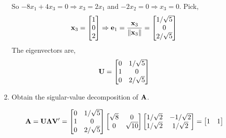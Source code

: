 \begin{enumerate}[font=\bfseries]
\begin{enumerate}
\[            \]
            So $-8x_1 + 4x_3 = 0 \Rightarrow x_3 = 2x_1$ and $-2x_2 = 0 \Rightarrow x_3 = 0$. Pick,
            \[
                \bold{x}_3
                =
                \begin{bmatrix}
                    1 \\
                    0 \\
                    2
                \end{bmatrix}
                \Rightarrow
                \bold{e}_1
                =
                \frac{\bold{x}_3}{\left\|\bold{x}_3\right\|}
                =
                \begin{bmatrix}
                    1/\sqrt{5} \\
                    0 \\
                    2/\sqrt{5}
                \end{bmatrix}
            \]
            The eigenvectors are,
            \[
                \bold{U}
                =
                \begin{bmatrix}
                    0 & 1/\sqrt{5} \\
                    1 & 0 \\
                    0 & 2/\sqrt{5}
                \end{bmatrix}
            \]
            \item Obtain the sigular-value decomposition of $\bold{A}$.
            \par
            \[
                \bold{A} = \bold{U}\bold{\Lambda}\bold{V}^\prime
                =
                \begin{bmatrix}
                    0 & 1/\sqrt{5} \\
                    1 & 0 \\
                    0 & 2/\sqrt{5}
                \end{bmatrix}
                \begin{bmatrix}
                    \sqrt{8} & 0 \\
                    0 & \sqrt{10}
                \end{bmatrix}
                \begin{bmatrix}
                    1/\sqrt{2} & -1/\sqrt{2} \\
                    1/\sqrt{2} & 1/\sqrt{2}
                \end{bmatrix}
                =
                \begin{bmatrix}
                    1 & 1 \\

\end{bmatrix}\]
\end{enumerate}
\end{enumerate}
